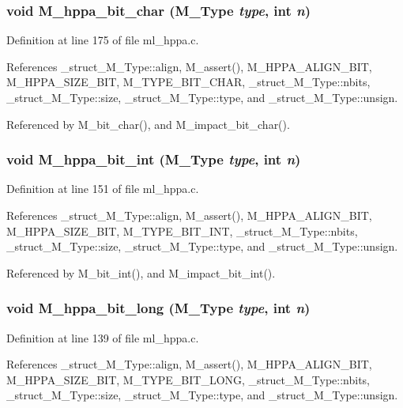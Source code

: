 \subsubsection{\setlength{\rightskip}{0pt plus 5cm}void M\_\-hppa\_\-bit\_\-char (\bf{M\_\-Type} {\em type}, int {\em n})}\label{m__hppa_8h_72487e5368b3b505364af89d6458c014}




Definition at line 175 of file ml\_\-hppa.c.

References \_\-struct\_\-M\_\-Type::align, M\_\-assert(), M\_\-HPPA\_\-ALIGN\_\-BIT, M\_\-HPPA\_\-SIZE\_\-BIT, M\_\-TYPE\_\-BIT\_\-CHAR, \_\-struct\_\-M\_\-Type::nbits, \_\-struct\_\-M\_\-Type::size, \_\-struct\_\-M\_\-Type::type, and \_\-struct\_\-M\_\-Type::unsign.

Referenced by M\_\-bit\_\-char(), and M\_\-impact\_\-bit\_\-char().
\subsubsection{\setlength{\rightskip}{0pt plus 5cm}void M\_\-hppa\_\-bit\_\-int (\bf{M\_\-Type} {\em type}, int {\em n})}\label{m__hppa_8h_db47df63a551328cf21f32439d2fb307}




Definition at line 151 of file ml\_\-hppa.c.

References \_\-struct\_\-M\_\-Type::align, M\_\-assert(), M\_\-HPPA\_\-ALIGN\_\-BIT, M\_\-HPPA\_\-SIZE\_\-BIT, M\_\-TYPE\_\-BIT\_\-INT, \_\-struct\_\-M\_\-Type::nbits, \_\-struct\_\-M\_\-Type::size, \_\-struct\_\-M\_\-Type::type, and \_\-struct\_\-M\_\-Type::unsign.

Referenced by M\_\-bit\_\-int(), and M\_\-impact\_\-bit\_\-int().
\subsubsection{\setlength{\rightskip}{0pt plus 5cm}void M\_\-hppa\_\-bit\_\-long (\bf{M\_\-Type} {\em type}, int {\em n})}\label{m__hppa_8h_db6cca7ff9ffeb7557ce4882e428f948}




Definition at line 139 of file ml\_\-hppa.c.

References \_\-struct\_\-M\_\-Type::align, M\_\-assert(), M\_\-HPPA\_\-ALIGN\_\-BIT, M\_\-HPPA\_\-SIZE\_\-BIT, M\_\-TYPE\_\-BIT\_\-LONG, \_\-struct\_\-M\_\-Type::nbits, \_\-struct\_\-M\_\-Type::size, \_\-struct\_\-M\_\-Type::type, and \_\-struct\_\-M\_\-Type::unsign.

